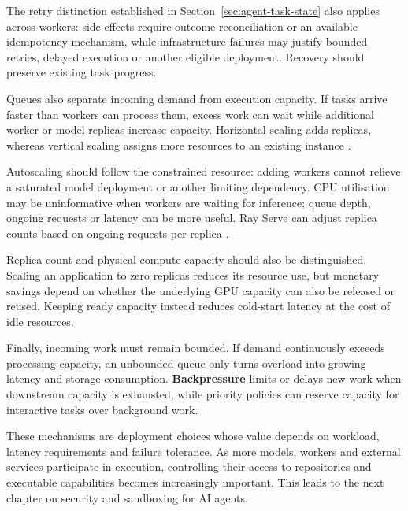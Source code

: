 The retry distinction established in Section~\ref{sec:agent-task-state} also applies across workers: side effects require outcome reconciliation or an available idempotency mechanism, while infrastructure failures may justify bounded retries, delayed execution or another eligible deployment. Recovery should preserve existing task progress.

Queues also separate incoming demand from execution capacity. If tasks arrive faster than workers can process them, excess work can wait while additional worker or model replicas increase capacity. Horizontal scaling adds replicas, whereas vertical scaling assigns more resources to an existing instance \parencite{kubernetes2026autoscaling}.

Autoscaling should follow the constrained resource: adding workers cannot relieve a saturated model deployment or another limiting dependency. CPU utilisation may be uninformative when workers are waiting for inference; queue depth, ongoing requests or latency can be more useful. Ray Serve can adjust replica counts based on ongoing requests per replica \parencite{ray-autoscaling}.

Replica count and physical compute capacity should also be distinguished. Scaling an application to zero replicas reduces its resource use, but monetary savings depend on whether the underlying GPU capacity can also be released or reused. Keeping ready capacity instead reduces cold-start latency at the cost of idle resources.

Finally, incoming work must remain bounded. If demand continuously exceeds processing capacity, an unbounded queue only turns overload into growing latency and storage consumption. \textbf{Backpressure} limits or delays new work when downstream capacity is exhausted, while priority policies can reserve capacity for interactive tasks over background work.

These mechanisms are deployment choices whose value depends on workload, latency requirements and failure tolerance. As more models, workers and external services participate in execution, controlling their access to repositories and executable capabilities becomes increasingly important. This leads to the next chapter on security and sandboxing for AI agents.

